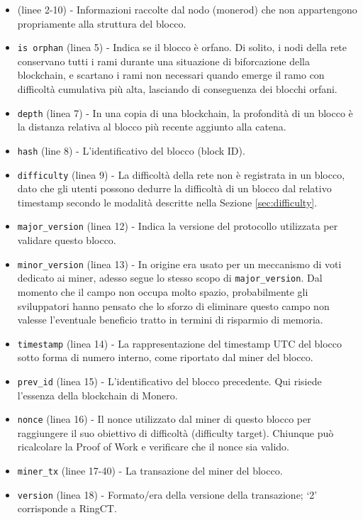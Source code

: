 \begin{appendices}
\begin{itemize}
	\item (linee 2-10) - Informazioni raccolte dal nodo (monerod) che non appartengono propriamente alla struttura del blocco.
    \item {\tt is orphan} (linea 5) - Indica se il blocco è orfano. Di solito, i nodi della rete conservano tutti i rami durante una situazione di biforcazione della blockchain, e scartano i rami non necessari quando emerge il ramo con difficoltà cumulativa più alta, lasciando di conseguenza dei blocchi orfani.
    \item {\tt depth} (linea 7) - In una copia di una blockchain, la profondità di un blocco è la distanza relativa al blocco più recente aggiunto alla catena.
    \item {\tt hash} (line 8) - L'identificativo del blocco (block ID).
    \item {\tt difficulty} (linea 9) - La difficoltà della rete non è registrata in un blocco, dato che gli utenti possono dedurre la difficoltà di un blocco dal relativo timestamp secondo le modalità descritte nella Sezione \ref{sec:difficulty}.
    \item {\tt major\_version} (linea 12) - Indica la versione del protocollo utilizzata per validare questo blocco.
    \item {\tt minor\_version} (linea 13) - In origine era usato per un meccanismo di voti dedicato ai miner, adesso segue lo stesso scopo di {\tt major\_version}. Dal momento che il campo non occupa molto spazio, probabilmente gli sviluppatori hanno pensato che lo sforzo di eliminare questo campo non valesse l'eventuale beneficio tratto in termini di risparmio di memoria.
    \item {\tt timestamp} (linea 14) - La rappresentazione del timestamp UTC del blocco sotto forma di numero interno, come riportato dal miner del blocco.
    \item {\tt prev\_id} (linea 15) - L'identificativo del blocco precedente. Qui risiede l'essenza della blockchain di Monero.
    \item {\tt nonce} (linea 16) - Il nonce utilizzato dal miner di questo blocco per raggiungere il suo obiettivo di difficoltà (difficulty target). Chiunque può ricalcolare la Proof of Work e verificare che il nonce sia valido.
    \item {\tt miner\_tx} (linee 17-40) - La transazione del miner del blocco.
    \item {\tt version} (linea 18) - Formato/era della versione della transazione; `2' corrisponde a RingCT.

\end{itemize}
\end{appendices}
